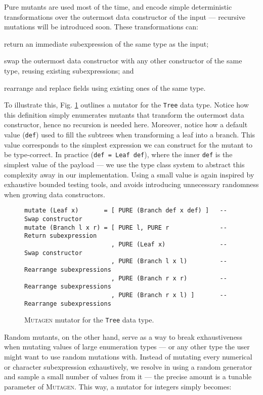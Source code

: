 \documentclass[acmsmall, anonymous]{acmart}
\newcommand{\mutagen}{\textsc{Mutagen}\xspace}
\begin{document}
Pure mutants are used most of the time, and encode simple deterministic
transformations over the outermost data constructor of the input --- recursive
mutations will be introduced soon.
%
These transformations can:
%
\begin{inparaenum}
\item return an immediate subexpression of the same type as the input;
\item swap the outermost data constructor with any other constructor of the
  same type, reusing existing subexpressions; and
\item rearrange and replace fields using existing ones of the same type.
\end{inparaenum}
%
To illustrate this, Fig. \ref{fig:mutagen:mutator} outlines a mutator for the
\texttt{Tree} data type.
%
Notice how this definition simply enumerates mutants that transform the
outermost data constructor, hence no recursion is needed here.
%
Moreover, notice how a default value (\texttt{def}) used to fill the subtrees
when transforming a leaf into a branch.
%
This value corresponds to the simplest expression we can construct for the
mutant to be type-correct.
%
In practice (\texttt{def = Leaf def}), where the inner \texttt{def} is the
simplest value of the payload --- we use the type class system to abstract this
complexity away in our implementation.
%
Using a small value is again inspired by exhaustive bounded testing tools, and
avoids introducing unnecessary randomness when growing data constructors.

\begin{figure}
\begin{verbatim}
mutate (Leaf x)       = [ PURE (Branch def x def) ]   -- Swap constructor
mutate (Branch l x r) = [ PURE l, PURE r              -- Return subexpression
                        , PURE (Leaf x)               -- Swap constructor
                        , PURE (Branch l x l)         -- Rearrange subexpressions
                        , PURE (Branch r x r)         -- Rearrange subexpressions
                        , PURE (Branch r x l) ]       -- Rearrange subexpressions
\end{verbatim}
\vspace{-5pt}
\caption{\label{fig:mutagen:mutator}\mutagen mutator for the \texttt{Tree} data
  type.}
\vspace{-25pt}
\end{figure}

%
Random mutants, on the other hand, serve as a way to break exhaustiveness when
mutating values of large enumeration types --- or any other type the user might
want to use random mutations with.
%
Instead of mutating every numerical or character subexpression exhaustively, we
resolve in using a random generator and sample a small number of values from it
--- the precise amount is a tunable parameter of \mutagen.
%
This way, a mutator for integers simply becomes:
\end{document}
